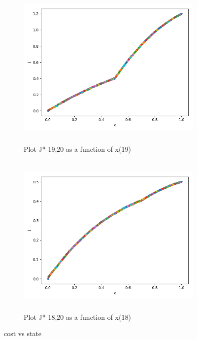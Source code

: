 \documentclass[12pt]{article}
\begin{document}
\begin{figure}[H]

\begin{subfigure}{}
\centering
\includegraphics[width=10cm, height=8cm, centre]{3a19.png} 
\caption{Plot J* 19,20 as a function of x(19)}
\label{fig:subim1}
\end{subfigure}

\begin{subfigure}{}
\centering
\includegraphics[width=10cm, height=8cm, centre]{3a18.png} 
\caption{Plot J* 18,20 as a function of x(18)}
\label{fig:subim1}
\end{subfigure}



\caption{cost vs state}
\label{fig:image2}
\end{figure}
\end{document}
